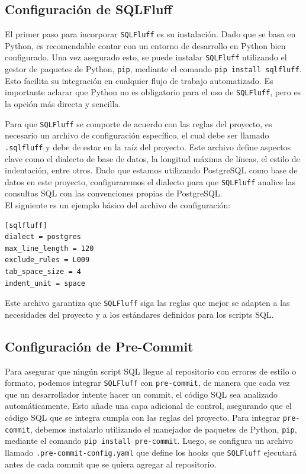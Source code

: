 \documentclass{IEEEtran}
\begin{document}
\subsection{Configuración de SQLFluff}

El primer paso para incorporar \texttt{SQLFluff} es su instalación. Dado que se basa en Python, es recomendable contar con un entorno de desarrollo en Python bien configurado. Una vez asegurado esto, se puede instalar \texttt{SQLFluff} utilizando el gestor de paquetes de Python, \texttt{pip}, mediante el comando \texttt{pip install sqlfluff}. Esto facilita su integración en cualquier flujo de trabajo automatizado. Es importante aclarar que Python no es obligatorio para el uso de \texttt{SQLFluff}, pero es la opción más directa y sencilla.

Para que \texttt{SQLFluff} se comporte de acuerdo con las reglas del proyecto, es necesario un archivo de configuración específico, el cual debe ser llamado \texttt{.sqlfluff} y debe de estar en la raíz del proyecto. Este archivo define aspectos clave como el dialecto de base de datos, la longitud máxima de líneas, el estilo de indentación, entre otros. Dado que estamos utilizando PostgreSQL como base de datos en este proyecto, configuraremos el dialecto para que \texttt{SQLFluff} analice las consultas SQL con las convenciones propias de PostgreSQL. \\ 

El siguiente es un ejemplo básico del archivo de configuración:

\begin{verbatim}
[sqlfluff]
dialect = postgres           
max_line_length = 120
exclude_rules = L009
tab_space_size = 4  
indent_unit = space          
\end{verbatim}

Este archivo garantiza que \texttt{SQLFluff} siga las reglas que mejor se adapten a las necesidades del proyecto y a los estándares definidos para los scripts SQL.

\subsection{Configuración de Pre-Commit}

Para asegurar que ningún script SQL llegue al repositorio con errores de estilo o formato, podemos integrar \texttt{SQLFluff} con \texttt{pre-commit}, de manera que cada vez que un desarrollador intente hacer un commit, el código SQL sea analizado automáticamente. Esto añade una capa adicional de control, asegurando que el código SQL que se integra cumpla con las reglas del proyecto. Para integrar \texttt{pre-commit}, debemos instalarlo utilizando el manejador de paquetes de Python, \texttt{pip}, mediante el comando \texttt{pip install pre-commit}. Luego, se configura un archivo llamado \texttt{.pre-commit-config.yaml} que define los hooks que \texttt{SQLFluff} ejecutará antes de cada commit que se quiera agregar al repositorio.
\end{document}
